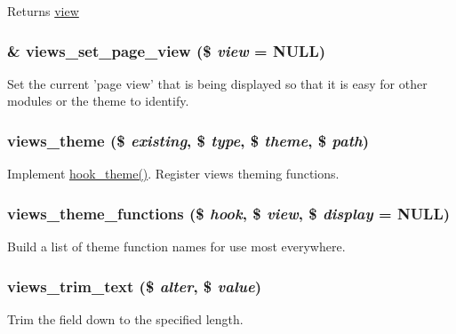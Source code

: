 \begin{DoxyReturn}{Returns}
\hyperlink{classview}{view} 
\end{DoxyReturn}
\hypertarget{views_8module_a71f9684b8a0e7aae0871333881fc06c7}{
\subsubsection[{views\_\-set\_\-page\_\-view}]{\setlength{\rightskip}{0pt plus 5cm}\& views\_\-set\_\-page\_\-view (\$ {\em view} = {\ttfamily NULL})}}
\label{views_8module_a71f9684b8a0e7aae0871333881fc06c7}
Set the current 'page view' that is being displayed so that it is easy for other modules or the theme to identify. \hypertarget{views_8module_aff7ae737313bb2250e6c27f9ca520627}{
\subsubsection[{views\_\-theme}]{\setlength{\rightskip}{0pt plus 5cm}views\_\-theme (\$ {\em existing}, \/  \$ {\em type}, \/  \$ {\em theme}, \/  \$ {\em path})}}
\label{views_8module_aff7ae737313bb2250e6c27f9ca520627}
Implement \hyperlink{group__hooks_ga013ccb45c7aaab1c16cf9691428c910d}{hook\_\-theme()}. Register views theming functions. \hypertarget{views_8module_a5c5e28542b853cf61c0540d05d057e40}{
\subsubsection[{views\_\-theme\_\-functions}]{\setlength{\rightskip}{0pt plus 5cm}views\_\-theme\_\-functions (\$ {\em hook}, \/  \$ {\em view}, \/  \$ {\em display} = {\ttfamily NULL})}}
\label{views_8module_a5c5e28542b853cf61c0540d05d057e40}
Build a list of theme function names for use most everywhere. \hypertarget{views_8module_aa312b055f6206c4ba0c088e60d339d9f}{
\subsubsection[{views\_\-trim\_\-text}]{\setlength{\rightskip}{0pt plus 5cm}views\_\-trim\_\-text (\$ {\em alter}, \/  \$ {\em value})}}
\label{views_8module_aa312b055f6206c4ba0c088e60d339d9f}
Trim the field down to the specified length.


